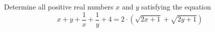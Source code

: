 Determine all positive real numbers $x$ and $y$ satisfying the equation\[x+y+\frac{1}{x}+\frac{1}{y}+4=2\cdot (\sqrt{2x+1}+\sqrt{2y+1})\]
